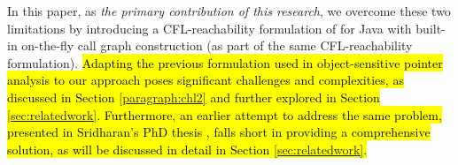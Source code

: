 
In this paper, as  \emph{the primary contribution of this research}, we overcome these two limitations by introducing a  CFL-reachability formulation of   for Java with  built-in on-the-fly call graph construction (as part of the
same CFL-reachability formulation).
%
\hl{Adapting the previous formulation used in object-sensitive pointer analysis \cite{lu2019precision, lu2021eagle} to our approach poses significant challenges and complexities, as discussed in Section \ref{paragraph:chl2} and further explored in Section \ref{sec:relatedwork}. Furthermore, an earlier attempt to address the same problem, presented in Sridharan's PhD thesis \cite{sridharan2007refinement}, falls short in providing a comprehensive solution, as will be discussed in detail in Section \ref{sec:relatedwork}.}
\begin{comment}
First, the CFL-reachability formulation does not have an equivalent set-constraint formulation as it is in the form of an intersection of several CFLs which has been proven to be undecidable \cite{reps2000undecidability}. Thus, attempting to obtain the CFL-reachability formulation from their corresponding set constraints by exploiting Melski-Reps reduction \cite{melski2000interconvertibility} is infeasible. Second, even we could use Melski-Reps reduction \cite{melski2000interconvertibility} to obtain a CFL-reachability formulation to track context-insensitive value flow with on-fly callgraph construction included, needless to say how complicated its form is, how to adapt it to support fully callsite-sensitivity is still a great challenge.
\end{comment}
